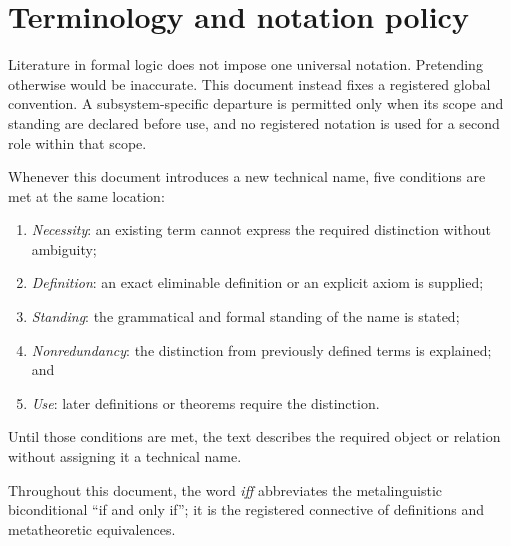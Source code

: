 \section*{Terminology and notation policy}

Literature in formal logic does not impose one universal notation.  Pretending
otherwise would be inaccurate.  This document instead fixes a registered
global convention.  A subsystem-specific departure is permitted only when its
scope and standing are declared before use, and no registered notation is used
for a second role within that scope.

Whenever this document introduces a new technical name, five conditions are
met at the same location:
\begin{enumerate}
  \item \emph{Necessity}: an existing term cannot express the required
        distinction without ambiguity;
  \item \emph{Definition}: an exact eliminable definition or an explicit axiom
        is supplied;
  \item \emph{Standing}: the grammatical and formal standing of the
        name is stated;
  \item \emph{Nonredundancy}: the distinction from previously defined terms is
        explained; and
  \item \emph{Use}: later definitions or theorems require the distinction.
\end{enumerate}
Until those conditions are met, the text describes the required object or
relation without assigning it a technical name.

Throughout this document, the word \emph{iff} abbreviates the
metalinguistic biconditional ``if and only if''; it is the registered
connective of definitions and metatheoretic equivalences.

